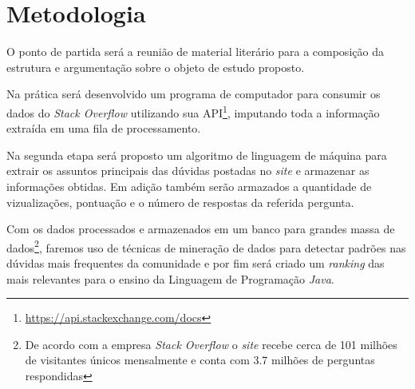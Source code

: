 
 
\chapter{Metodologia}

O ponto de partida será a reunião de material literário para a composição da estrutura e argumentação sobre o objeto de estudo proposto.

Na prática será desenvolvido um programa de computador para consumir os dados do \textit{Stack Overflow} utilizando sua API\footnote{\url{https://api.stackexchange.com/docs}}, imputando toda a informação extraída em uma fila de processamento.

Na segunda etapa será proposto um algoritmo de linguagem de máquina \cite{Hulth:2003:IAK:1119355.1119383} para extrair os assuntos principais \cite{Turney:2000:LAK:593957.593993} das dúvidas postadas no \textit{site} e armazenar as informações obtidas. Em adição também serão armazados a quantidade de vizualizações, pontuação e o número de respostas da referida pergunta.  

Com os dados processados e armazenados em um banco para grandes massa de dados\footnote{De acordo com a empresa \textit{Stack Overflow} o \textit{site} recebe cerca de 101 milhões de visitantes únicos mensalmente e conta com 3.7 milhões de perguntas respondidas}, faremos uso de técnicas de mineração de dados para detectar padrões nas dúvidas mais frequentes da comunidade e por fim será criado um \textit{ranking} \cite{mihalcea-tarau:2004:EMNLP} das mais relevantes para o ensino da Linguagem de Programação \emph{Java}. 

